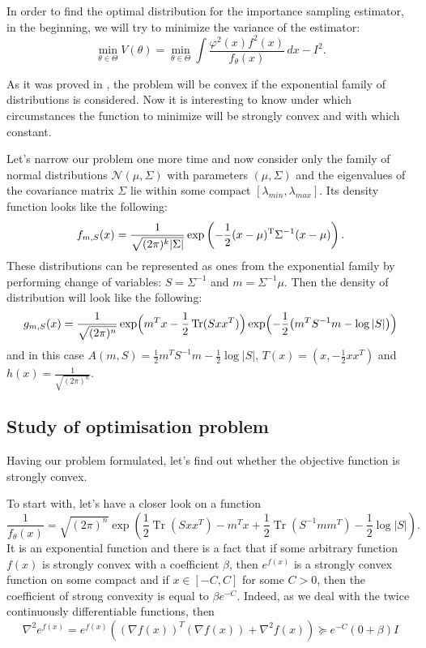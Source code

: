 \documentclass{article}
\DeclareMathOperator{\trace}{Tr}
\begin{document}
In order to find the optimal distribution for the importance sampling estimator, in the beginning, we will try to minimize the variance of the estimator:
\[
\min_{\theta \in \Theta} V(\theta) = \min_{\theta \in \Theta} \int \frac{\varphi^2(x)f^2(x)}{f_{\theta}(x)} \, dx - I^2. 
\]

As it was proved in \cite{boyd}, the problem will be convex if the exponential family of distributions is considered. Now it is interesting to know under which circumstances the function to minimize will be strongly convex and with which constant.

Let's narrow our problem one more time and now consider only the family of normal distributions  $\mathcal{N} (\mu, \Sigma)$ with parameters $(\mu, \Sigma)$ and the eigenvalues of the covariance matrix $\Sigma$ lie within some compact $[\lambda_{min}, \lambda_{max}]$. Its density function looks like the following:
\[
f_{m,S}(x)= \frac{1}{\sqrt { (2\pi)^k| \Sigma| } }  \exp\left(-{1 \over 2} (x-\mu)^{\rm T} \Sigma^{-1} ( x-\mu)\right).
\]
These distributions can be represented as ones from the exponential family by performing change of variables: $S = \Sigma^{-1}$ and $m = \Sigma^{-1} \mu$. Then the density of distribution will look like the following:
\[
g_{m,S}(x) = \frac1{\sqrt{(2\pi)^n}} \exp \Bigl( m^T x - \frac 12 \trace( Sxx^T ) \Bigr) \exp \Bigl(- \frac 1 2 \bigl( m^TS^{-1}m - \log |S| \bigr) \Bigr)
\]
and in this case $A(m, S) = \frac 12 m^TS^{-1} m - \frac 12 \log |S|$, $T(x) = (x, -\frac 12 xx^T)$ and $h(x) = \frac 1{\sqrt{(2\pi)^n}}$.

\subsection*{Study of optimisation problem}

Having our problem formulated, let's find out whether the objective function is strongly convex.

To start with, let's have a closer look on a function 
\[
\frac1{f_{\theta}(x)} = \sqrt{(2\pi)^n} \exp\left( \frac12 \trace(Sxx^T) - m^Tx + \frac 12 \trace (S^{-1}mm^T) - \frac12 \log |S|\right).
\]
It is an exponential function and there is a fact that if some arbitrary function $f(x)$ is strongly convex with a coefficient $\beta$, then $e^{f(x)}$ is a strongly convex function on some compact and if $x \in [-C, C]$ for some $C > 0$, then the coefficient of strong convexity is equal to $\beta e^{-C}$. Indeed, as we deal with the twice continuously differentiable functions, then
\[
\nabla^2 e^{f(x)} = e^{f(x)}\left((\nabla f(x))^T(\nabla f(x)) + \nabla^2 f(x)\right) \succeq e^{-C}(0 + \beta)I
\]
\end{document}
